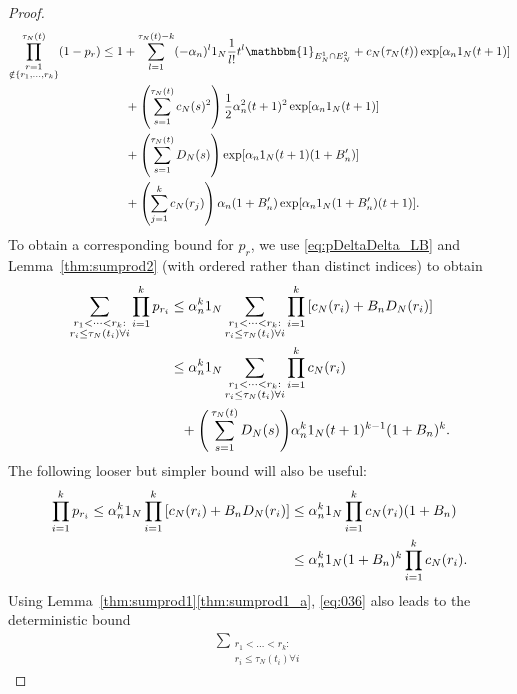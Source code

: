 \documentclass[12pt,authoryear]{article}
\theoremstyle{definition}
\newcommand{\1}[1]{\mathbbm{1}_{#1}}
\newcommand{\ON}{1_N}
\begin{document}
\begin{proof}
\begin{align}
\prod_{\substack{r=1 \\ \notin \{r_1,\dots,r_k\} }}^{\tau_N(t)} (1-p_r)&\leq 1+ \sum_{l=1}^{\tau_N(t) -k} (-\alpha_n)^l \ON \frac{1}{l!} t^l
        \1{E_N^1 \cap E_N^2}
        + c_N(\tau_N(t)) \exp[ \alpha_n \ON (t+1) ] \notag\\
    &\qquad+ \left( \sum_{s=1}^{\tau_N(t)} c_N(s)^2 \right)
        \frac{1}{2} \alpha_n^2 (t+1)^2 \exp[ \alpha_n \ON (t+1) ] \notag\\
    &\qquad+ \left( \sum_{s=1}^{\tau_N(t)} D_N(s) \right)
        \exp[ \alpha_n \ON (t+1) (1+B_n^\prime) ] \notag\\
    &\qquad+ \left( \sum_{j=1}^k c_N(r_j) \right)
        \alpha_n (1 + B_n^\prime)
        \exp[ \alpha_n \ON (1 + B_n^\prime) (t+1) ] . \label{eq:034b}
\end{align}
To obtain a corresponding bound for $p_r$, we use \eqref{eq:pDeltaDelta_LB} and Lemma~\ref{thm:sumprod2} (with ordered rather than distinct indices) to obtain
\begin{align}
\sum_{\substack{r_1 <\dots< r_k :\\ r_i \leq \tau_N(t_i) \forall i}}
        \prod_{i=1}^k p_{r_i}
&\leq \alpha_n^k \ON 
        \sum_{\substack{r_1 <\dots< r_k :\\ r_i \leq \tau_N(t_i) \forall i}}
        \prod_{i=1}^k \left[ c_N(r_i) + B_n D_N(r_i) \right] \notag\\
&\leq \alpha_n^k \ON
        \sum_{\substack{r_1 <\dots< r_k :\\ r_i \leq \tau_N(t_i) \forall i}}
        \prod_{i=1}^k c_N(r_i) \notag \\
        &\phantom{\leq} + \Bigg( \sum_{s=1}^{\tau_N(t)} D_N(s) \Bigg)
        \alpha_n^k \ON (t+1)^{k-1} (1+B_n)^k . \label{eq:035}
\end{align}
The following looser but simpler bound will also be useful:
\begin{align}
\prod_{i=1}^k p_{r_i}
\leq \alpha_n^k \ON 
        \prod_{i=1}^k \left[ c_N(r_i) + B_n D_N(r_i) \right] 
        &\leq \alpha_n^k \ON  \prod_{i=1}^k c_N(r_i) (1 + B_n) \notag\\
&\leq \alpha_n^k \ON (1 + B_n)^k
        \prod_{i=1}^k c_N(r_i). \label{eq:036}
\end{align}
Using Lemma~\ref{thm:sumprod1}\ref{thm:sumprod1_a}, \eqref{eq:036} also leads to the deterministic bound
\begin{align}
\sum_{\substack{r_1 <\dots< r_k :\\ r_i \leq \tau_N(t_i) \forall i}}

\end{align}
\end{proof}
\end{document}
